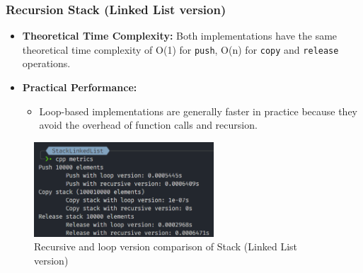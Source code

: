 \subsubsection*{Recursion Stack (Linked List version)}
\begin{itemize}
	\item \textbf{Theoretical Time Complexity:} Both implementations have the same theoretical time complexity of O(1) for \verb|push|, O(n) for \verb|copy| and \verb|release| operations.
	\item \textbf{Practical Performance:}
	      \begin{itemize}
		      \item  Loop-based implementations are generally faster in practice because they avoid the overhead of function calls and recursion.
	      \end{itemize}
\end{itemize}
\begin{figure}[!ht]
	\centering
	\includegraphics[width=0.6\textwidth]{imgs/StackLinkedList/metrics.png}
	\caption{Recursive and loop version comparison of Stack (Linked List version)}\label{fig:stack_ll_metrics}
\end{figure}